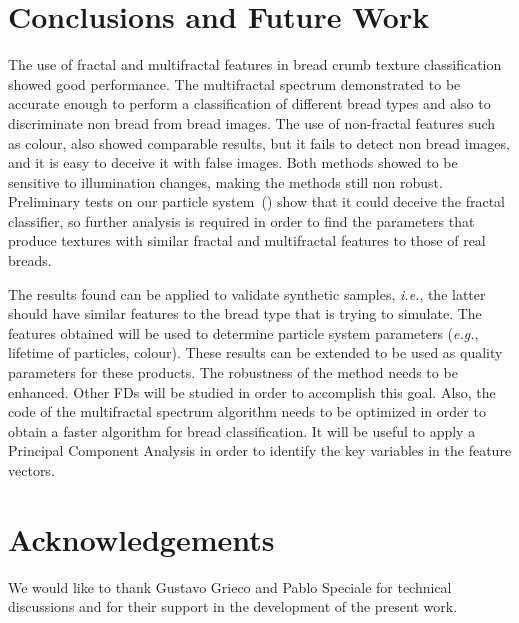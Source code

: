 \documentclass[oneside,a4paper,english,links]{amca}
\newcommand{\todo}[1]{\textbf{[TODO: #1]}}
\begin{document}

\section{Conclusions and Future Work}
The use of fractal and multifractal features in bread crumb texture classification showed good performance. The multifractal spectrum demonstrated to be accurate enough to perform a classification of different bread types and also to discriminate non bread from bread images. The use of non-fractal features such as colour, also showed comparable results, but it fails to detect non bread images, and it is easy to deceive it with false images. Both methods showed to be sensitive to illumination changes, making the methods still non robust. Preliminary tests on our particle system~(\cite{Baravalle2011}) show that it could deceive the fractal classifier, so further analysis is required in order to find the parameters that produce textures with similar fractal and multifractal features to those of real breads.

The results found can be applied to validate synthetic samples, {\em i.e.}, the latter should have similar features to the bread type that is trying to simulate. The features obtained will be used to determine particle system parameters ({\em e.g.}, lifetime of particles, colour). These results can be extended to be used as quality parameters for these products. The robustness of the method needs to be enhanced. Other FDs will be studied in order to accomplish this goal. Also, the code of the multifractal spectrum algorithm needs to be optimized in order to obtain a faster algorithm for bread classification. It will be useful to apply a Principal Component Analysis in order to identify the key variables in the feature vectors. 

\section{Acknowledgements}
We would like to thank Gustavo Grieco and Pablo Speciale for technical discussions and for their support in the development of the present work.

%

\end{document}
